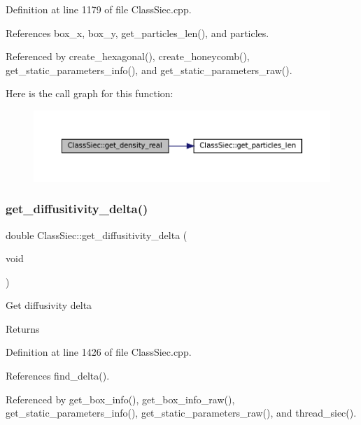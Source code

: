 Definition at line 1179 of file Class\+Siec.\+cpp.



References box\+\_\+x, box\+\_\+y, get\+\_\+particles\+\_\+len(), and particles.



Referenced by create\+\_\+hexagonal(), create\+\_\+honeycomb(), get\+\_\+static\+\_\+parameters\+\_\+info(), and get\+\_\+static\+\_\+parameters\+\_\+raw().

Here is the call graph for this function\+:\nopagebreak
\begin{figure}[H]
\begin{center}
\leavevmode
\includegraphics[width=350pt]{classClassSiec_aad61574e5a2c57c21f3404b7a60ee189_cgraph}
\end{center}
\end{figure}
\mbox{\label{classClassSiec_a5d81d2e727712fbb0f6f596eee09f354}} 
\subsubsection{\texorpdfstring{get\+\_\+diffusitivity\+\_\+delta()}{get\_diffusitivity\_delta()}}
{\footnotesize\ttfamily double Class\+Siec\+::get\+\_\+diffusitivity\+\_\+delta (\begin{DoxyParamCaption}\item[{void}]{ }\end{DoxyParamCaption})}

Get diffusivity delta \begin{DoxyReturn}{Returns}

\end{DoxyReturn}


Definition at line 1426 of file Class\+Siec.\+cpp.



References find\+\_\+delta().



Referenced by get\+\_\+box\+\_\+info(), get\+\_\+box\+\_\+info\+\_\+raw(), get\+\_\+static\+\_\+parameters\+\_\+info(), get\+\_\+static\+\_\+parameters\+\_\+raw(), and thread\+\_\+siec().

